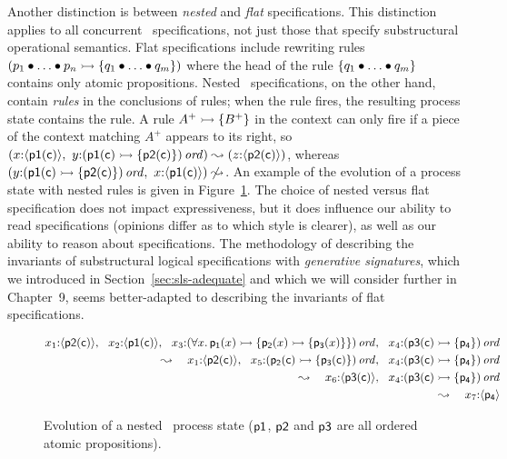 Another
distinction is between  {\it nested} and {\it flat}
specifications. This distinction applies to all concurrent
\sls~specifications, not just those that specify substructural
operational semantics. Flat
specifications include rewriting rules $\left( p_1 \mathbin{\bullet} \ldots \mathbin{\bullet}
  p_n \rightarrowtail \{ q_1 \mathbin{\bullet} \ldots \mathbin{\bullet} q_m \} \right)$ where the head
of the rule $\{ q_1 \mathbin{\bullet} \ldots \mathbin{\bullet} q_m \}$ contains only atomic
propositions. Nested \sls~specifications, on the other hand,
contain {\it rules} in the conclusions of rules; when the rule fires,
the resulting process state contains the rule. 
A rule $A^+ \rightarrowtail \{ B^+ \}$ in the context can only fire if a piece 
of the context
matching $A^+$ appears to its right, so  $\left(x{:}\langle {\sf p1(c)} \rangle, ~
y{:}{\left( {\sf p1(c)} \rightarrowtail \{ {\sf p2(c)} \} \right)}\,{{\it ord}}\right)
\leadsto \left(z{:}\langle {\sf p2(c)} \rangle\right)$, whereas 
$\left(y{:}{\left( {\sf p1(c)} \rightarrowtail \{ {\sf p2(c)} \} \right)}\,{{\it ord}},~
x{:}\langle {\sf p1(c)} \rangle\right)
\not \leadsto$. An example of the evolution of a 
process state with nested rules is given 
in Figure~\ref{fig:ho-evo-ex}.
%
The choice of nested versus flat specification does not impact
expressiveness, but it does influence our ability to read
specifications (opinions differ as to which style is clearer), as well
as our ability to reason about specifications. The methodology of
describing the invariants of substructural logical specifications with
{\it generative signatures}, which we introduced in
Section~\ref{sec:sls-adequate} and which we will consider further in
Chapter~9, seems better-adapted to describing the invariants of flat
specifications.

\begin{figure}[t]
\begin{align*}
x_1{:}\langle {{\sf p2}({\sf c})} \rangle, ~~
x_2{:}\langle {{\sf p1}({\sf c})} \rangle, ~~
x_3{:}{(\forall x.\,{\sf p_1}(x) 
                \rightarrowtail \{ {\sf p_2}(x) \rightarrowtail \{ {\sf p_3}(x) \} \})}\,{{\it ord}}, ~~
x_4{:}{({\sf p3}({\sf c}) \rightarrowtail \{ {\sf p_4} \})}\,{{\it ord}} & \\
\leadsto ~~~ 
x_1{:}\langle {{\sf p2}({\sf c})} \rangle, ~~
x_5{:}{({\sf p_2}({\sf c}) \rightarrowtail \{ {\sf p_3}({\sf c}) \})}\,{{\it ord}}, ~~
x_4{:}{({\sf p3}({\sf c}) \rightarrowtail \{ {\sf p_4} \})}\,{{\it ord}} & \\
\leadsto ~~~ 
x_6{:}\langle {{\sf p3}({\sf c})} \rangle, ~~
x_4{:}{({\sf p3}({\sf c}) \rightarrowtail \{ {\sf p_4} \})}\,{{\it ord}} & \\
\leadsto ~~~ 
x_7{:}\langle {{\sf p_4}} \rangle & 
\end{align*}
\caption{Evolution of a nested \sls~process state (${\sf p1}$, ${\sf
  p2}$ and ${\sf p3}$ are all ordered atomic propositions).}
\label{fig:ho-evo-ex}
\end{figure}

